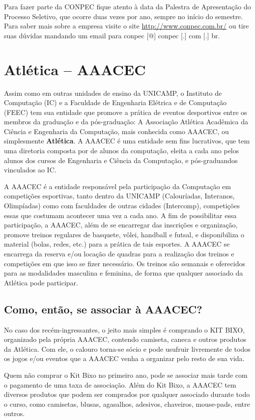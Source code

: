 \documentclass[a4paper,10pt, twocolumn]{article}
\begin{document}
Para fazer parte da CONPEC fique atento à data da Palestra de Apresentação do
Processo Seletivo, que ocorre duas vezes por ano, sempre no início do semestre.
Para saber mais sobre a empresa visite o site \url{http://www.conpec.com.br/} ou
tire suas dúvidas mandando um email para conpec [@] conpec [.] com [.] br.

\section{Atlética -- AAACEC}
Assim como em outras unidades de ensino da UNICAMP, o Instituto de Computação
(IC) e a Faculdade de Engenharia Elétrica e de Computação (FEEC) tem sua
entidade que promove a prática de eventos desportivos entre os membros da
graduação e da pós-graduação: A Associação Atlética Acadêmica da Ciência
e Engenharia da Computação, mais conhecida como AAACEC, ou simplesmente
\textbf{Atlética}. A AAACEC é uma entidade sem fins lucrativos, que tem uma
diretoria composta por de alunos da computação, eleita a cada ano pelos alunos
dos cursos de Engenharia e Ciência da Computação, e pós-graduandos vinculados ao
IC.

A AAACEC é a entidade responsável pela participação da Computação em competições
esportivas, tanto dentro da UNICAMP (Calouríadas, Interanos, Olimpíadas) como
com faculdades de outras cidades (Intercomp), competições essas que costumam
acontecer uma vez a cada ano. A fim de possibilitar essa participação, a AAACEC,
além de se encarregar das inscrições e organização, promove treinos regulares de
basquete, vôlei, handball e futsal, e disponibiliza o material (bolas, redes,
etc.) para a prática de tais esportes. A AAACEC se encarrega da reserva e/ou
locação de quadras para a realização dos treinos e competições em que isso se
fizer necessário. Os treinos são semanais e oferecidos para as modalidades
masculina e feminina, de forma que qualquer associado da Atlética pode
participar.

\subsection{Como, então, se associar à AAACEC?}
No caso dos recém-ingressantes, o jeito mais simples é comprando o KIT BIXO,
organizado pela própria AAACEC, contendo camiseta, caneca e outros produtos da
Atlética. Com ele, o calouro torna-se sócio e pode usufruir livremente de todos
os jogos e/ou eventos que a AAACEC venha a organizar pelo resto de sua vida.

Quem não comprar o Kit Bixo no primeiro ano, pode se associar mais tarde com
o pagamento de uma taxa de associação. Além do Kit Bixo, a AAACEC tem diversos
produtos que podem ser comprados por qualquer associado durante todo o curso,
como camisetas, blusas, agasalhos, adesivos, chaveiros, mouse-pads, entre
outros.
\end{document}
